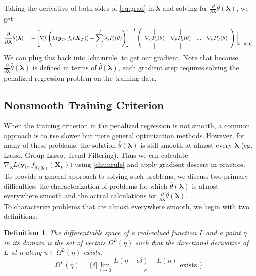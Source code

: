 \documentclass[10pt,letterpaper]{article}
\newtheorem{definition}{Definition}
\newcommand*{\vertbar}{\rule[-1ex]{0.5pt}{2.5ex}}
\begin{document}
Taking the derivative of both sides of \eqref{eq:grad} in $\boldsymbol{\lambda}$ and solving for $\frac{\partial}{\partial \boldsymbol{\lambda}} \hat{\theta}(\boldsymbol{\lambda})$, we get:
\begin{equation}
\frac{\partial}{\partial \boldsymbol{\lambda}} \hat{\theta}(\boldsymbol{\lambda}) = 
- \left [ \nabla_\theta^2 \left (  L(\boldsymbol{y}_T, f_\theta (\boldsymbol{X}_T))  +  \sum\limits_{i=1}^J \lambda_i P_i(\theta)  \right )  \right ]^{-1}
\left (
\begin{array}{cccc}
\vertbar & \vertbar &        & \vertbar \\
\nabla_\theta P_1(\theta) & \nabla_\theta P_2(\theta) &  ... &  \nabla_\theta P_J(\theta) \\
\vertbar & \vertbar &        & \vertbar 
\end{array}
\right ) \bigg |_{\theta = \hat \theta(\boldsymbol{\lambda})}
\label{implicitDifferentiation}
\end{equation}
We can plug this back into \eqref{chainrule} to get our gradient. Note that because $\frac{\partial}{\partial \boldsymbol{\lambda}} \hat{\theta}(\boldsymbol{\lambda})$ is defined in terms of $\hat{\theta}\left(\boldsymbol{\lambda}\right)$, each gradient step requires solving the penalized regression problem on the training data.

\subsection{Nonsmooth Training Criterion}
When the training criterion in the penalized regression is not smooth, a common approach is to use slower but more general optimization methods. However, for many of these problems, the solution $\hat{\theta}\left(\boldsymbol{\lambda}\right)$ is still smooth at almost every $\boldsymbol{\lambda}$ (eg. Lasso, Group Lasso, Trend Filtering). Thus we can calculate $\nabla_{\boldsymbol{\lambda}} L \Big( \boldsymbol{y}_V, f_{\hat{\theta}(\boldsymbol{\lambda})}(\boldsymbol{X}_V) \Big )$ using \eqref{chainrule} and apply gradient descent in practice. To provide a general approach to solving such problems, we discuss two primary difficulties: the characterization of problems for which $\hat{\theta}\left(\boldsymbol{\lambda}\right)$ is almost everywhere smooth and the actual calculations for $\frac{\partial}{\partial \boldsymbol{\lambda}} \hat{\theta}(\boldsymbol{\lambda})$.\\

\vspace{2mm}
To characterize problems that are almost everywhere smooth, we begin with two definitions:
\begin{definition}
The differentiable space of a real-valued function $L$ and a point $\eta$ in its domain is the set of vectors $\Omega^{L}(\eta)$ such that the directional derivative of $L$ at $\eta$ along $u \in \Omega^{L}(\eta)$ exists.
\begin{equation}
\Omega^{L}(\eta) = \Big\{ \delta | \lim_{\epsilon \rightarrow 0} \frac{L(\eta + \epsilon \delta) - L(\eta)}{\epsilon} \text{ exists } \Big\}
\end{equation}
\end{definition}
\end{document}
